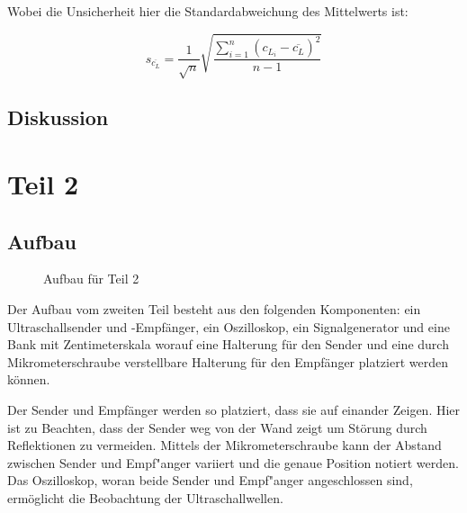 \documentclass[11pt,a4paper]{article}
\begin{document}
Wobei die Unsicherheit hier die Standardabweichung des Mittelwerts ist:

$$s_{\overline{c_L}} = \frac{1}{\sqrt{n}} \sqrt{\frac{\sum_{i=1}^{n}(c_{L_i}-\overline{c_L})^2}{n-1}}$$

\subsection{Diskussion}

\pagebreak
\section{Teil 2}

\subsection{Aufbau}

\begin{figure}
	\centering \vspace{-20pt}
	\vspace{-5pt}
	\caption{Aufbau für Teil 2 \cite{Anleitung}}
	\label{abb2}
\end{figure}

Der Aufbau vom zweiten Teil besteht aus den folgenden Komponenten:
ein Ultraschallsender und -Empfänger, ein Oszilloskop, ein Signalgenerator und eine Bank mit Zentimeterskala worauf eine Halterung für den Sender und eine durch Mikrometerschraube verstellbare Halterung für den Empfänger platziert werden können. 

Der Sender und Empfänger werden so platziert, dass sie auf einander Zeigen. Hier ist zu Beachten, dass der Sender weg von der Wand zeigt um Störung durch Reflektionen zu vermeiden. Mittels der  Mikrometerschraube kann der Abstand zwischen Sender und Empf"anger variiert und die genaue Position notiert werden. Das Oszilloskop, woran beide Sender und Empf"anger angeschlossen sind, ermöglicht die Beobachtung der Ultraschallwellen.
\end{document}

